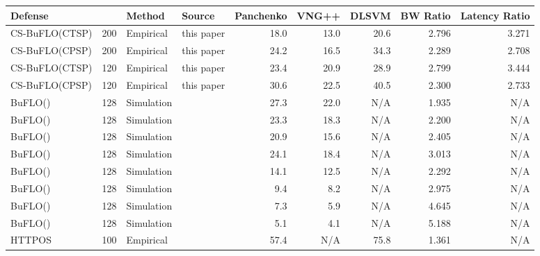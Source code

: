 \documentclass[10pt,journal]{IEEEtran}
\newcommand{\buflo} {BuFLO\xspace}
\newcommand{\csb} {CS-BuFLO\xspace}
\begin{document}
\begin{table*}
\begin{minipage}{\textwidth}                                                                                         
  \begin{center}
  \begin{tabular}{|lrllrrrrr|}
    \hline
    Defense                            &  & Method     & Source                  & Panchenko & VNG++ & DLSVM & BW Ratio & Latency Ratio \\
    \hline
    \hline
    \csb (CTSP)                        & 200 & Empirical  & this paper              & 18.0      & 13.0  & 20.6  & 2.796    & 3.271         \\
    \csb (CPSP)                        & 200 & Empirical  & this paper              & 24.2      & 16.5  & 34.3  & 2.289    & 2.708         \\
    \csb (CTSP)                        & 120 & Empirical  & this paper              & 23.4      & 20.9  & 28.9  & 2.799    & 3.444         \\
    \csb (CPSP)                        & 120 & Empirical  & this paper              & 30.6      & 22.5  & 40.5  & 2.300    & 2.733         \\
    \hline
    \buflo()    & 128 & Simulation & \cite{dyer-snp12}       & 27.3      & 22.0  & N/A   & 1.935    & N/A           \\
    \buflo()    & 128 & Simulation & \cite{dyer-snp12}       & 23.3      & 18.3  & N/A   & 2.200    & N/A           \\
    \buflo()    & 128 & Simulation & \cite{dyer-snp12}       & 20.9      & 15.6  & N/A   & 2.405    & N/A           \\
    \buflo()    & 128 & Simulation & \cite{dyer-snp12}       & 24.1      & 18.4  & N/A   & 3.013    & N/A           \\
    \buflo() & 128 & Simulation & \cite{dyer-snp12}       & 14.1      & 12.5  & N/A   & 2.292    & N/A           \\
    \buflo() & 128 & Simulation & \cite{dyer-snp12}       & 9.4       & 8.2   & N/A   & 2.975    & N/A           \\
    \buflo() & 128 & Simulation & \cite{dyer-snp12}       & 7.3       & 5.9   & N/A   & 4.645    & N/A           \\
    \buflo() & 128 & Simulation & \cite{dyer-snp12}       & 5.1       & 4.1   & N/A   & 5.188    & N/A           \\
    \hline
    HTTPOS                             & 100 & Empirical  & \cite{cai-ccs12}        & 57.4      & N/A   & 75.8  & 1.361    & N/A           \\

\end{tabular}
\end{center}
\end{minipage}
\end{table*}
\end{document}
